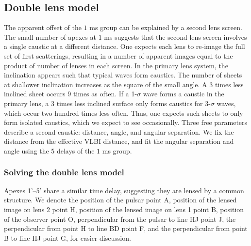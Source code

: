 \documentclass[useAMS,usenatbib]{mn2e}
\begin{document}
\subsection{Double lens model}
\label{doublelensmodel}

The apparent offset of the $1$ ms group can be explained by a second lens
screen.  The small number of apexes at $1$ ms suggests that the second
lens screen involves a single caustic at a different distance.  One
expects each lens to re-image the full set of first scatterings,
resulting in a number of apparent images equal to the product of
number of lenses in each screen.
In the
primary lens system, the inclination appears such that typical waves
form caustics.  The number of sheets at shallower inclination
increases as the square of the small angle.  A 3 times less inclined
sheet occurs 9 times as often.  If a 1-$\sigma$ wave forms a caustic
in the primary lens, a 3 times less inclined surface only forms
caustics for 3-$\sigma$ waves, which occur two hundred times less
often.  Thus, one expects such sheets to only form isolated caustics,
which we expect to see occasionally.  Three free parameters describe a
second caustic: distance, angle, and angular separation.  We fix the
distance from the effective VLBI distance, and fit the angular
separation and angle using the 5 delays of the $1$ ms group.

\subsubsection{Solving the double lens model}
Apexes 1'--5' share a similar time delay, suggesting they are lensed by
a common structure.
We denote the position of the pulsar point A, position of the lensed image on lens 2 point H, position of the lensed image on lens 1 point B, position of the observer point O, perpendicular from the pulsar to line HJ point J, the perpendicular from point H to line BD point F, and the perpendicular from point B to line HJ point G, for easier discussion.
\end{document}
